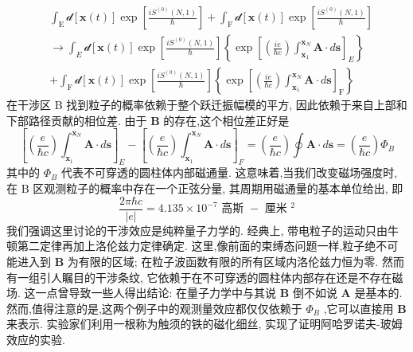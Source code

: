 \begin{equation}
\begin{aligned}
	&\int_{\mathrm{E}}\mathcal{d}\left\lbrack {\mathbf{x}\left( t\right) }\right\rbrack \exp \left\lbrack \frac{i{S}^{\left( 0\right) }\left( {N,1}\right) }{\hbar }\right\rbrack + \int_{\mathrm{F}}\mathcal{d}\left\lbrack {\mathbf{x}\left( t\right) }\right\rbrack \exp \left\lbrack \frac{i{S}^{\left( 0\right) }\left( {N,1}\right) }{\hbar }\right\rbrack\\
	&\rightarrow \int_{E}\mathcal{d}\left\lbrack {\mathbf{x}\left( t\right) }\right\rbrack \exp \left\lbrack \frac{i{S}^{\left( 0\right) }\left( {N,1}\right) }{\hbar }\right\rbrack \left\{ {\exp {\left\lbrack \left( \frac{ie}{\hbar c}\right) \int_{{\mathbf{x}}_{1}}^{{\mathbf{x}}_{N}}\mathbf{A} \cdot d\mathbf{s}\right\rbrack }_{E}}\right\}\\
	&+ \int_{\mathrm{F}}\mathcal{d}\left\lbrack {\mathbf{x}\left( t\right) }\right\rbrack \exp \left\lbrack \frac{i{S}^{\left( 0\right) }\left( {N,1}\right) }{\hbar }\right\rbrack \left\{ {\exp {\left\lbrack \left( \frac{ie}{\hbar c}\right) \int_{{\mathbf{x}}_{1}}^{{\mathbf{x}}_{N}}\mathbf{A} \cdot d\mathbf{s}\right\rbrack }_{\mathrm{F}}}\right\}
\end{aligned}
\end{equation}
在干涉区 B 找到粒子的概率依赖于整个跃迁振幅模的平方, 因此依赖于来自上部和下部路径贡献的相位差. 由于 $\mathbf{B}$ 的存在,这个相位差正好是
\begin{equation}
{\left\lbrack \left( \frac{e}{\hbar c}\right) \int_{{\mathbf{x}}_{1}}^{{\mathbf{x}}_{N}}\mathbf{A} \cdot d\mathbf{s}\right\rbrack }_{E} - {\left\lbrack \left( \frac{e}{\hbar c}\right) \int_{{\mathbf{x}}_{1}}^{{\mathbf{x}}_{N}}\mathbf{A} \cdot d\mathbf{s}\right\rbrack }_{F} = \left( \frac{e}{\hbar c}\right) \oint \mathbf{A} \cdot d\mathbf{s}= \left( \frac{e}{\hbar c}\right) {\Phi }_{B}
\end{equation}
其中的 ${\Phi }_{B}$ 代表不可穿透的圆柱体内部磁通量. 这意味着,当我们改变磁场强度时,在 $\mathrm{B}$ 区观测粒子的概率中存在一个正弦分量, 其周期用磁通量的基本单位给出, 即
\begin{equation}
\frac{{2\pi }\hbar c}{\left| e\right| } = {4.135} \times {10}^{-7}\text{ 高斯 } - \text{ 厘米 }{}^{2}
\end{equation}
我们强调这里讨论的干涉效应是纯粹量子力学的. 经典上, 带电粒子的运动只由牛顿第二定律再加上洛伦兹力定律确定. 这里,像前面的束缚态问题一样,粒子绝不可能进入到 $\mathbf{B}$ 为有限的区域; 在粒子波函数有限的所有区域内洛伦兹力恒为零. 然而有一组引人瞩目的干涉条纹, 它依赖于在不可穿透的圆柱体内部存在还是不存在磁场. 这一点曾导致一些人得出结论: 在量子力学中与其说 $\mathbf{B}$ 倒不如说 $\mathbf{A}$ 是基本的. 然而,值得注意的是,这两个例子中的观测量效应都仅仅依赖于 ${\Phi }_{B}$ ,它可以直接用 $\mathbf{B}$ 来表示. 实验家们利用一根称为触须的铁的磁化细丝, 实现了证明阿哈罗诺夫-玻姆效应的实验.


